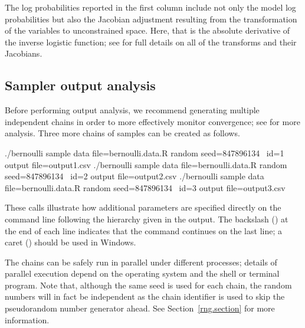 \documentclass[article]{jss}
\begin{document}
The log probabilities reported in the first column include not only
the model log probabilities but also the Jacobian adjustment resulting
from the transformation of the variables to unconstrained space.
Here, that is the absolute derivative of the inverse logistic
function;  see \citep{Stan:2013} for full details on all of the
transforms and their Jacobians.


\subsection{Sampler output analysis}

Before performing output analysis, we recommend generating multiple
independent chains in order to more effectively monitor convergence;
see \citep{GelmanRubin:1992} for more analysis.  Three more chains of
samples can be created as follows.
%
\begin{CodeChunk}
\begin{CodeInput}
./bernoulli sample data file=bernoulli.data.R random seed=847896134 \
            id=1 output file=output1.csv
./bernoulli sample data file=bernoulli.data.R random seed=847896134 \
            id=2 output file=output2.csv
./bernoulli sample data file=bernoulli.data.R random seed=847896134 \
            id=3 output file=output3.csv
\end{CodeInput}
\end{CodeChunk}
%
These calls illustrate how additional parameters are specified
directly on the command line following the hierarchy given in the
output.  The backslash (\code{\textbackslash}) at the end of each line indicates
that the command continues on the last line;  a caret (\code{\textasciicircum})
should be used in Windows.

The chains can be safely run in parallel under different processes;
details of parallel execution depend on the operating system and the shell or
terminal program. Note that, although the same seed is used for each chain, the
random numbers will in fact be independent as the chain identifier
is used to skip the pseudorandom number generator ahead.  See
Section~\ref{rng.section} for more information.
\end{document}
